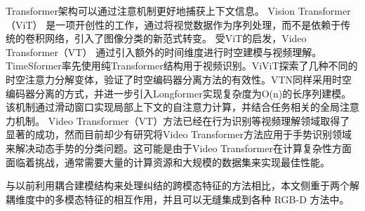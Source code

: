 Transformer架构\cite{vaswani2017attention}可以通过注意机制更好地捕获上下文信息。
Vision Transformer（ViT） \cite{vit2021image}是一项开创性的工作，通过将视觉数据作为序列处理，而不是依赖于传统的卷积网络，引入了图像分类的新范式转变。
受ViT的启发，Video Transformer（VT）\cite{selva2023video} 通过引入额外的时间维度进行时空建模与视频理解。
TimeSformer\cite{bertasius2021space}率先使用纯Transformer结构用于视频识别。ViViT\cite{arnab2021vivit}探索了几种不同的时空注意力分解变体，验证了时空编码器分离方法的有效性。VTN\cite{neimark2021video}同样采用时空编码器分离的方式，并进一步引入Longformer实现复杂度为O(n)的长序列建模。
该机制通过滑动窗口实现局部上下文的自注意力计算，并结合任务相关的全局注意力机制。
Video Transformer（VT）方法已经在行为识别等视频理解领域取得了显著的成功，然而目前却少有研究将Video Transformer方法应用于手势识别领域来解决动态手势的分类问题。这可能是由于Video Transformer在计算复杂性方面面临着挑战，通常需要大量的计算资源和大规模的数据集来实现最佳性能\cite{khan2022transformers}。

与以前利用耦合建模结构来处理纠结的跨模态特征的方法相比，本文侧重于两个解耦维度中的多模态特征的相互作用，并且可以无缝集成到各种 RGB-D 方法中。



